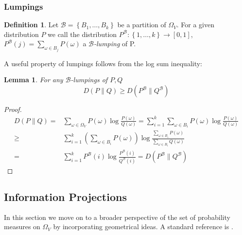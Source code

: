 \documentclass[12pt]{amsart}
\newcommand{\set}[1]{\left\lbrace #1 \right\rbrace} %
\theoremstyle{plain}%
\newtheorem{lem}[thm]{Lemma}
\theoremstyle{definition}
\newtheorem{defn}[thm]{Definition}
\theoremstyle{remark}
\begin{document}
\subsubsection{Lumpings}
\label{sec:definitionoflumpings}  
\begin{defn}
  Let $\mathcal{B} = \set{B_1,\ldots,B_k}$ be a partition of
  $\Omega_V$.  For a given distribution $P$ we call the distribution
  $P^{\mathcal{B}} : \set{1,\ldots, k} \to \left[0,1\right]$,
  $P^{\mathcal{B}}(j) = \sum_{\omega\in B_j}P(\omega)$ a
  \emph{$\mathcal{B}$-lumping}  of P.
\end{defn}
A useful property of lumpings follows from the log sum inequality:
\begin{lem}
For any $\mathcal{B}$-lumpings of $P,Q$
  \begin{equation*}
    \label{eq:divergenceinequalityforlumpings}
    D(P \parallel Q) \geq D(P^{\mathcal{B}}\parallel Q^{\mathcal{B}})
  \end{equation*}
\end{lem}
\begin{proof}
  \begin{align*}
    \label{eq:proofofdivergencestuff127}
    D(P \parallel Q) = & \sum_{\omega\in\Omega_V} P(\omega) \log \frac{P(\omega)}{Q(\omega)} = \sum_{i=1}^k \sum_{\omega \in B_i} P(\omega) \log \frac{P(\omega)}{Q(\omega)} \\
    \geq & \sum_{i=1}^k \left(\sum_{\omega\in B_i} P(\omega)\right) \log \frac{\sum_{\omega\in B_i} P(\omega)}{\sum_{\omega\in B_i}Q(\omega)} \\
    = & \sum_{i=1}^k P^{\mathcal{B}}(i) \log \frac{P^{\mathcal{B}}(i)}{Q^{\mathcal{B}}(i)} = D(P^{\mathcal{B}}\parallel Q^{\mathcal{B}})
  \end{align*}
\end{proof}

\subsection{Information Projections}
In this section we move on to a broader perspective of the set of
probability measures on $\Omega_V$ by incorporating geometrical ideas.
A standard reference is \cite{Amari00}.
\end{document}
